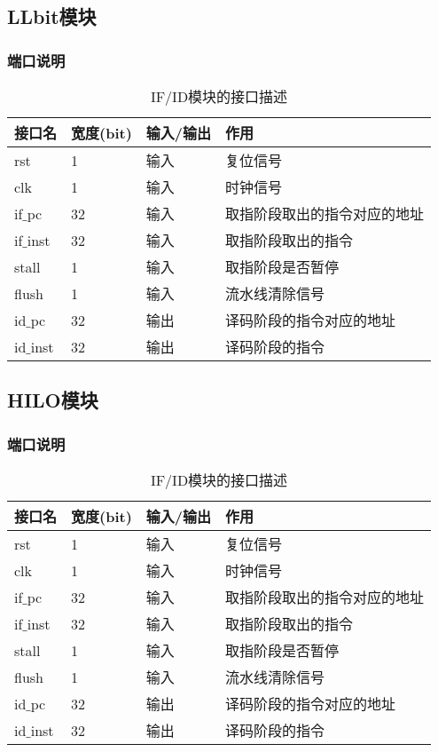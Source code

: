 \subsection{LLbit模块}
\subsubsection{端口说明}
\begin{table}[H]
	\centering
	\caption{IF/ID模块的接口描述}
	\begin{tabular}{|l|l|l|l|}
		\hline
		接口名 & 宽度(bit) & 输入/输出 & 作用 \\
		\hline
		rst & 1 & 输入 & 复位信号 \\
		\hline
		clk & 1 & 输入 & 时钟信号 \\
		\hline
		if$\_$pc & 32 & 输入 & 取指阶段取出的指令对应的地址 \\
		\hline
		if$\_$inst & 32 & 输入 & 取指阶段取出的指令 \\
		\hline
		stall & 1 & 输入 & 取指阶段是否暂停 \\
		\hline
		flush & 1 & 输入 & 流水线清除信号 \\
		\hline
		id$\_$pc & 32 & 输出 & 译码阶段的指令对应的地址 \\
		\hline
		id$\_$inst & 32 & 输出 & 译码阶段的指令 \\
		\hline
	\end{tabular}
\end{table}
\subsection{HILO模块}
\subsubsection{端口说明}
\begin{table}[H]
	\centering
	\caption{IF/ID模块的接口描述}
	\begin{tabular}{|l|l|l|l|}
		\hline
		接口名 & 宽度(bit) & 输入/输出 & 作用 \\
		\hline
		rst & 1 & 输入 & 复位信号 \\
		\hline
		clk & 1 & 输入 & 时钟信号 \\
		\hline
		if$\_$pc & 32 & 输入 & 取指阶段取出的指令对应的地址 \\
		\hline
		if$\_$inst & 32 & 输入 & 取指阶段取出的指令 \\
		\hline
		stall & 1 & 输入 & 取指阶段是否暂停 \\
		\hline
		flush & 1 & 输入 & 流水线清除信号 \\
		\hline
		id$\_$pc & 32 & 输出 & 译码阶段的指令对应的地址 \\
		\hline
		id$\_$inst & 32 & 输出 & 译码阶段的指令 \\
		\hline
	\end{tabular}
\end{table}
